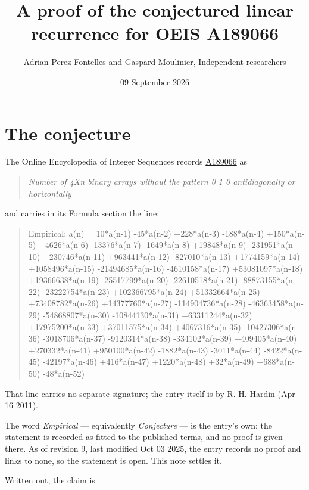 \documentclass[11pt]{article}
\title{A proof of the conjectured linear recurrence for OEIS A189066}
\author{Adrian Perez Fontelles and Gaspard Moulinier, Independent researchers}
\date{09 September 2026}
\theoremstyle{definition}
\begin{document}
\maketitle
\section{The conjecture}

The Online Encyclopedia of Integer Sequences records \href{https://oeis.org/A189066}{A189066} as

\begin{quote}\itshape Number of 4Xn binary arrays without the pattern 0 1 0 antidiagonally or horizontally\end{quote}

and carries in its Formula section the line:

\begin{quote}\ttfamily Empirical: a(n) = 10*a(n-1) -45*a(n-2) +228*a(n-3) -188*a(n-4) +150*a(n-5) +4626*a(n-6) -13376*a(n-7) -1649*a(n-8) +19848*a(n-9) -231951*a(n-10) +230746*a(n-11) +963441*a(n-12) -827010*a(n-13) +1774159*a(n-14) +1058496*a(n-15) -21494685*a(n-16) -4610158*a(n-17) +53081097*a(n-18) +19366638*a(n-19) -25517799*a(n-20) -22610518*a(n-21) -88873155*a(n-22) -23222754*a(n-23) +102366795*a(n-24) +51332664*a(n-25) +73408782*a(n-26) +14377760*a(n-27) -114904736*a(n-28) -46363458*a(n-29) -54868807*a(n-30) -10844130*a(n-31) +63311244*a(n-32) +17975200*a(n-33) +37011575*a(n-34) +4067316*a(n-35) -10427306*a(n-36) -3018706*a(n-37) -9120314*a(n-38) -334102*a(n-39) +409405*a(n-40) +270332*a(n-41) +950100*a(n-42) -1882*a(n-43) -3011*a(n-44) -8422*a(n-45) -42197*a(n-46) +416*a(n-47) +1220*a(n-48) +32*a(n-49) +688*a(n-50) -48*a(n-52)\end{quote}

That line carries no separate signature; the entry itself is by R. H. Hardin (Apr 16 2011).

The word {\itshape Empirical} --- equivalently {\itshape Conjecture} --- is the entry's own: the statement is recorded as fitted to the published terms, and no proof is given there. As of revision 9, last modified Oct 03 2025, the entry records no proof and links to none, so the statement is open. This note settles it.

Written out, the claim is
\end{document}
